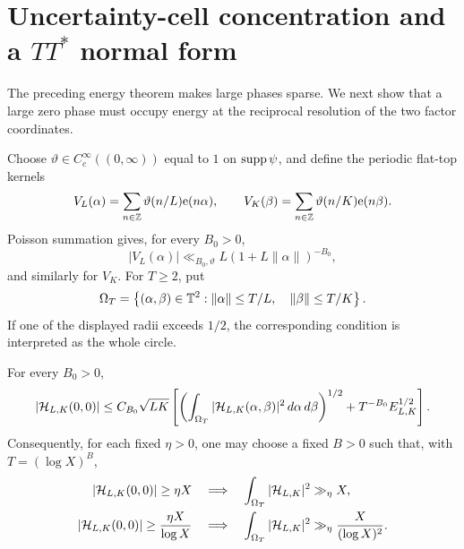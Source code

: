 \section{\texorpdfstring{Uncertainty-cell concentration and a $TT^*$
normal form}{Uncertainty-cell concentration and a TT* normal form}}
\label{sec:planck-ttstar}

The preceding energy theorem makes large phases sparse.  We next show
that a large zero phase must occupy energy at the reciprocal resolution
of the two factor coordinates.

Choose $\vartheta\in C_c^\infty((0,\infty))$ equal to $1$ on
$\operatorname{supp}\psi$, and define the periodic flat-top kernels
\begin{equation}
 V_L(\alpha)=\sum_{n\in\mathbb Z}\vartheta(n/L)\mathrm e(n\alpha),
 \qquad
 V_K(\beta)=\sum_{n\in\mathbb Z}\vartheta(n/K)\mathrm e(n\beta).
 \label{eq:flat-top-kernels}
\end{equation}
Poisson summation gives, for every $B_0>0$,
\begin{equation}
 |V_L(\alpha)|\ll_{B_0,\vartheta}
 L(1+L\|\alpha\|)^{-B_0},
 \label{eq:flat-top-decay}
\end{equation}
and similarly for $V_K$.  For $T\ge2$, put
\begin{equation}
 \Omega_T=\left\{(\alpha,\beta)\in\mathbb T^2:
 \|\alpha\|\le T/L,\quad \|\beta\|\le T/K\right\}.
 \label{eq:uncertainty-cell}
\end{equation}
If one of the displayed radii exceeds $1/2$, the corresponding
condition is interpreted as the whole circle.

\begin{theorem}
\label{thm:flat-top-localization}
For every $B_0>0$,
\begin{equation}
 |\mathcal H_{L,K}(0,0)|
 \le C_{B_0}\sqrt{LK}
 \left[
 \left(\int_{\Omega_T}|\mathcal H_{L,K}(\alpha,\beta)|^2
 \,d\alpha\,d\beta\right)^{1/2}
 +T^{-B_0}E_{L,K}^{1/2}
 \right].
 \label{eq:flat-top-localization}
\end{equation}
Consequently, for each fixed $\eta>0$, one may choose a fixed
$B>0$ such that, with $T=(\log X)^B$,
\begin{align}
 |\mathcal H_{L,K}(0,0)|\ge\eta X
 &\quad\Longrightarrow\quad
 \int_{\Omega_T}|\mathcal H_{L,K}|^2
 \gg_\eta X,
 \label{eq:natural-planck-concentration}\\
 |\mathcal H_{L,K}(0,0)|\ge\frac{\eta X}{\log X}
 &\quad\Longrightarrow\quad
 \int_{\Omega_T}|\mathcal H_{L,K}|^2
 \gg_\eta\frac{X}{(\log X)^2}.
 \label{eq:witness-planck-concentration}
\end{align}
\end{theorem}

